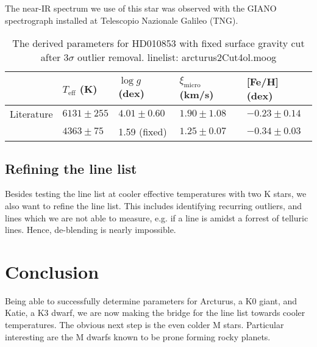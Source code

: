 \documentclass{aa}
\begin{document}
The near-IR spectrum we use of this star was observed with the GIANO
spectrograph installed at Telescopio Nazionale Galileo (TNG).




\begin{table*}[htb!]
    \caption{The derived parameters for HD010853 with
    fixed surface gravity cut after 3$\sigma$ outlier removal. linelist: arcturus2Cut4ol.moog}
    \label{tab:hd010853}
    \centering
    \begin{tabular}{lllll}
      \hline\hline
                     & $T_\mathrm{eff}$ (K) &  $\log g$ (dex)  &   $\xi_\mathrm{micro}$ (km/s)  & [Fe/H] (dex)      \\
      \hline
        Literature   & $6131 \pm 255$       &  $4.01 \pm 0.60$ &    $1.90 \pm 1.08$              & $-0.23 \pm 0.14$ \\
      \hline
                     & $4363 \pm 75$        &   1.59 (fixed)   &    $1.25 \pm 0.07$              & $-0.34 \pm 0.03$ \\
      \hline
    \end{tabular}
\end{table*}




\subsection{Refining the line list}
\label{sub:refining_the_line_list}
Besides testing the line list at cooler effective temperatures
with two K stars, we also want to refine the line list. This
includes identifying recurring outliers, and lines which we are
not able to measure, e.g. if a line is amidst a forrest of
telluric lines. Hence, de-blending is nearly impossible.









\section{Conclusion}
\label{sec:conclusion}
Being able to successfully determine parameters for Arcturus, a K0 giant, and
Katie, a K3 dwarf, we are now making the bridge for the line list towards cooler
temperatures. The obvious next step is the even colder M stars. Particular
interesting are the M dwarfs known to be prone forming rocky planets.
\end{document}
